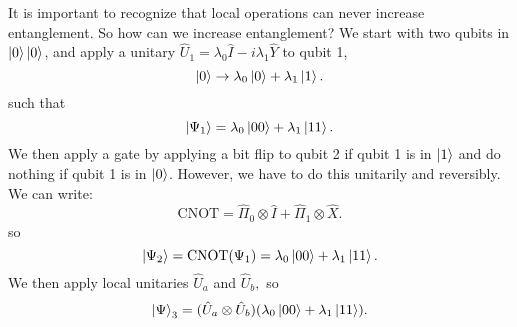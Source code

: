 \documentclass{article}
\numberwithin{equation}{section}
\begin{document}
It is important to recognize that local operations can never increase entanglement. So how can we increase entanglement? We start with two qubits in $\ket 0 \ket 0$, and apply a unitary $\hat{U}_1 = \lambda_0 \hat{I} -i\lambda_1 \hat{Y}$ to qubit 1,
\begin{equation}
    \ket 0 \rightarrow \lambda_0\ket 0 + \lambda_1\ket 1.
\end{equation}
such that 
\begin{equation}
    \ket{\Psi_1} = \lambda_0\ket{00} + \lambda_1\ket{11}.
\end{equation}
We then apply a  gate by applying a bit flip to qubit 2 if qubit 1 is in $\ket 1$ and do nothing if qubit 1 is in $\ket 0$. However, we have to do this unitarily and reversibly. We can write:
\begin{equation}
    \text{CNOT} = \hat{\Pi}_0 \otimes \hat{I} + \hat{\Pi}_1 \otimes \hat{X}.
\end{equation}
so 
\begin{equation}
    \ket{\Psi_2} = \text{CNOT}(\Psi_1) = \lambda_0\ket{00} + \lambda_1\ket{11}. 
\end{equation}
We then apply local unitaries $\hat{U}_a$ and $\hat{U}_b,$ so 
\begin{equation}
    \ket\Psi_3 = (\hat{U}_a \otimes \hat{U}_b) (\lambda_0\ket{00} + \lambda_1\ket{11}).
\end{equation}

\newpage
\end{document}
